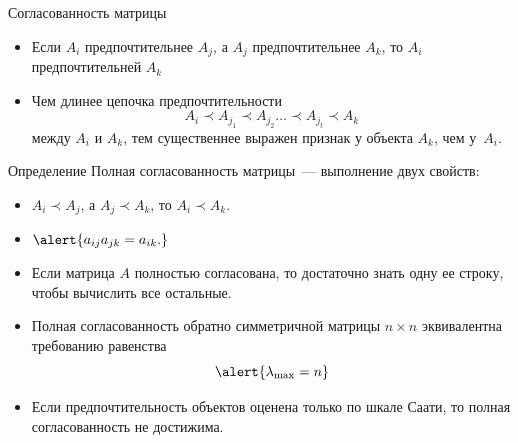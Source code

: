 \documentclass[unicode,11pt,notheorems,xcolor=table]{beamer}
\begin{document}
\begin{frame}[allowframebreaks]{Согласованность матрицы}{}
    \begin{itemize}
        \item Если $A_i$ предпочтительнее $A_j$, а $A_j$ предпочтительнее $A_k$, то $A_i$ предпочтительней $A_k$
        \item Чем длинее цепочка предпочтительности
        $$
            A_i \prec A_{j_1} \prec A_{j_2}\ldots \prec A_{j_t} \prec A_{k}
        $$
        между $A_i$ и $A_k$, тем существеннее выражен признак у объекта $A_k$, чем у~$A_i$.
    \end{itemize}

    \begin{block}{Определение}
        \alert{Полная согласованность} матрицы~--- выполнение двух свойств:
        \begin{itemize}
            \item $A_i\prec A_j$, а $A_j \prec A_k$, то $A_i \prec A_k$.
            \item $\alert{a_{ij}a_{jk}=a_{ik}.}$
        \end{itemize}
    \end{block}
    \framebreak
        \begin{itemize}
            \item Если матрица $A$ полностью согласована, то достаточно знать одну ее строку, чтобы вычислить все остальные. 
            \item Полная согласованность обратно симметричной матрицы $n\times n$ эквивалентна требованию равенства 
            $$
               \alert{\lambda_{\max} =n }
            $$
            \item Если предпочтительность объектов оценена только по шкале Саати, то полная согласованность  не достижима.
        \end{itemize}
    \end{frame}
\end{document}
